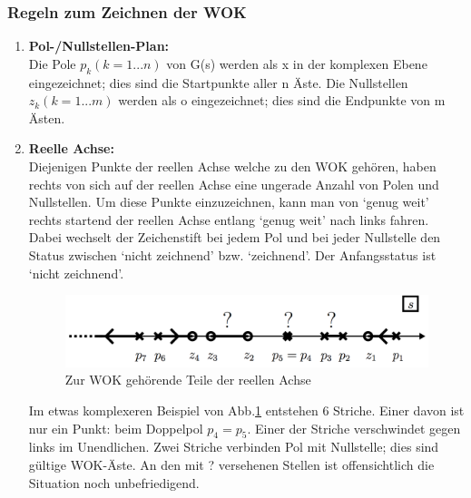 \subsubsection{Regeln zum Zeichnen der WOK }
\begin{enumerate}
\item \textbf{Pol-/Nullstellen-Plan:}\\
Die Pole $p_k (k = 1...n)$ von G(s) werden als x in der komplexen Ebene eingezeichnet;
dies sind die Startpunkte aller n Äste. Die Nullstellen $z_k (k = 1...m)$
werden als o eingezeichnet; dies sind die Endpunkte von m Ästen.
\item \textbf{Reelle Achse:}\\
Diejenigen Punkte der reellen Achse welche zu den WOK gehören, haben rechts
von sich auf der reellen Achse eine ungerade Anzahl von Polen und Nullstellen.
Um diese Punkte einzuzeichnen, kann man von ‘genug weit’ rechts startend
der reellen Achse entlang ‘genug weit’ nach links fahren. Dabei wechselt der
Zeichenstift bei jedem Pol und bei jeder Nullstelle den Status zwischen ‘nicht
zeichnend’ bzw. ‘zeichnend’. Der Anfangsstatus ist ‘nicht zeichnend’.
\begin{figure}[h!]
	\begin{center}
		\includegraphics[width=12cm]{./images/reelleAchsePoleNullWOK.png}
	\end{center}
	\caption{Zur WOK gehörende Teile der reellen Achse}
	\label{beispielAchse}
\end{figure}

Im etwas komplexeren Beispiel von Abb.\ref{beispielAchse} entstehen 6 Striche. Einer davon
ist nur ein Punkt: beim Doppelpol $p_4 = p_5$. Einer der Striche verschwindet
gegen links im Unendlichen. Zwei Striche verbinden Pol mit Nullstelle; dies
sind gültige WOK-Äste. An den mit ? versehenen Stellen ist offensichtlich die
Situation noch unbefriedigend.



\end{enumerate}
